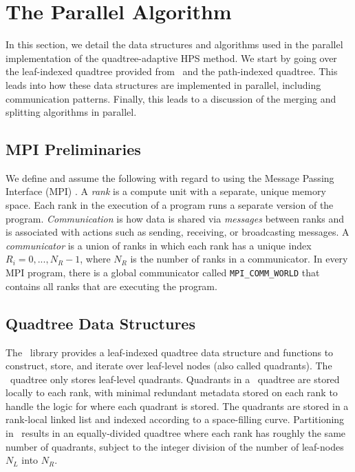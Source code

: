 \section{The Parallel Algorithm}
\label{sec:parallel-algorithm}

In this section, we detail the data structures and algorithms used in the parallel implementation of the quadtree-adaptive HPS method. We start by going over the leaf-indexed quadtree provided from \pforest\ and the path-indexed quadtree. This leads into how these data structures are implemented in parallel, including communication patterns. Finally, this leads to a discussion of the merging and splitting algorithms in parallel.

\subsection{MPI Preliminaries}

We define and assume the following with regard to using the Message Passing Interface (MPI) \cite{mpi40}. A {\em rank} is a compute unit with a separate, unique memory space. Each rank in the execution of a program runs a separate version of the program. {\em Communication} is how data is shared via {\em messages} between ranks and is associated with actions such as sending, receiving, or broadcasting messages. A {\em communicator} is a union of ranks in which each rank has a unique index $R_i = 0, ..., N_{R}-1$, where $N_R$ is the number of ranks in a communicator. In every MPI program, there is a global communicator called {\tt MPI\_COMM\_WORLD} that contains all ranks that are executing the program.

\subsection{Quadtree Data Structures}
\label{sub:quadtree-data-structures}

The \pforest\ library provides a leaf-indexed quadtree data structure and functions to construct, store, and iterate over leaf-level nodes (also called quadrants). The \pforest\ quadtree only stores leaf-level quadrants. Quadrants in a \pforest\ quadtree are stored locally to each rank, with minimal redundant metadata stored on each rank to handle the logic for where each quadrant is stored. The quadrants are stored in a rank-local linked list and indexed according to a space-filling curve. Partitioning in \pforest\ results in an equally-divided quadtree where each rank has roughly the same number of quadrants, subject to the integer division of the number of leaf-nodes $N_{L}$ into $N_{R}$.

